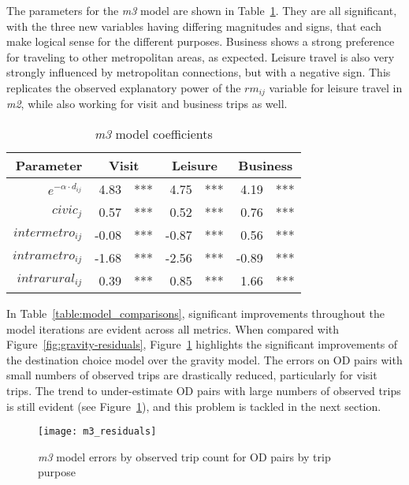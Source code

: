 The parameters for the \textit{m3} model are shown in Table~\ref{table:m3-coeff}. They are all significant, with the three new variables having differing magnitudes and signs, that each make logical sense for the different purposes. Business shows a strong preference for traveling to other metropolitan areas, as expected. Leisure travel is also very strongly influenced by metropolitan connections, but with a negative sign. This replicates the observed explanatory power of the $rm_{ij}$ variable for leisure travel in \textit{m2}, while also working for visit and business trips as well.


\begin{table}[H]
\centering
\caption{\textit{m3} model coefficients}
\label{table:m3-coeff}
\begin{tabular}{@{}rrlrlrl@{}}
  \toprule
 Parameter & \multicolumn{2}{c}{Visit} & \multicolumn{2}{c}{Leisure} & \multicolumn{2}{c}{Business} \\ \midrule
  $e^{-\alpha \cdot d_{ij}}$ 	& 4.83 & *** & 4.75 & *** & 4.19 & *** \\  
  $civic_j$ & 0.57 & *** & 0.52 & *** & 0.76 & *** \\ 
  $intermetro_{ij}$ & -0.08 & *** & -0.87 & *** & 0.56 & *** \\ 
  $intrametro_{ij}$ & -1.68 & *** & -2.56 & *** & -0.89 & *** \\  
  $intrarural_{ij}$ & 0.39 & *** & 0.85 & *** & 1.66 & *** \\ 
   \bottomrule
\end{tabular}
\end{table}

In Table~\ref{table:model_comparisons}, significant improvements throughout the model iterations are evident across all metrics. When compared with Figure~\ref{fig:gravity-residuals}, Figure~\ref{fig:m3_residuals} highlights the significant improvements of the destination choice model over the gravity model. The errors on OD pairs with small numbers of observed trips are drastically reduced, particularly for visit trips. The trend to under-estimate OD pairs with large numbers of observed trips is still evident (see Figure~\ref{fig:m3_residuals}), and this problem is tackled in the next section. 


\begin{figure}[H]
\centering
\texttt{[image: m3\_residuals]}
\caption{\textit{m3} model errors by observed trip count for OD pairs by trip purpose}
\label{fig:m3_residuals}
\end{figure}


